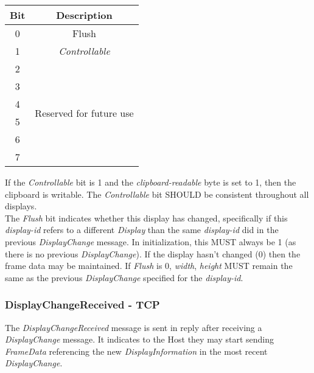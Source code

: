 \documentclass{article}
\begin{document}
    \begin{center}
        \begin{tabular}{|c|c|}
            \hline
            \textbf{Bit} & \textbf{Description}                        \\
            \hline
            0            & Flush                                       \\
            \hline
            1            & \emph{Controllable}                         \\
            \hline
            2            & \multirow{6}{10em}{Reserved for future use} \\
            3            &                                             \\
            4            &                                             \\
            5            &                                             \\
            6            &                                             \\
            7            &                                             \\
            \hline
        \end{tabular}
    \end{center}

    If the \emph{Controllable} bit is 1 and the \emph{clipboard-readable} byte is set to 1, then the clipboard is writable. The \emph{Controllable} bit SHOULD be consistent throughout all displays.\\

    The \emph{Flush} bit indicates whether this display has changed, specifically if this \emph{display-id} refers to a different \emph{Display} than the same \emph{display-id} did in the previous \emph{DisplayChange} message. In initialization, this MUST always be 1 (as there is no previous \emph{DisplayChange}). If the display hasn't changed (0) then the frame data may be maintained. If \emph{Flush} is 0, \emph{width}, \emph{height} MUST remain the same as the previous \emph{DisplayChange} specified for the \emph{display-id}.

    \subsubsection{DisplayChangeReceived - TCP}

    The \emph{DisplayChangeReceived} message is sent in reply after receiving a \emph{DisplayChange} message. It indicates to the Host they may start sending \emph{FrameData} referencing the new \emph{DisplayInformation} in the most recent \emph{DisplayChange}.
\end{document}

